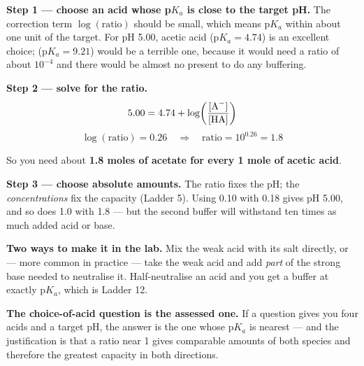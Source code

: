 \documentclass{apchem-worksheet}
\begin{document}
\begin{workedexample}
\textbf{Step 1 --- choose an acid whose p$K_{a}$ is close to the target
pH.} The correction term $\log(\text{ratio})$ should be small, which
means p$K_{a}$ within about one unit of the target. For pH 5.00, acetic
acid (p$K_{a} = 4.74$) is an excellent choice; 
(p$K_{a} = 9.21$) would be a terrible one, because it would need a
ratio of about $10^{-4}$ and there would be almost no  present
to do any buffering.

\textbf{Step 2 --- solve for the ratio.}
\[ 5.00 = 4.74 + \log\!\left(\frac{[\ce{A-}]}{[\ce{HA}]}\right) \]
\[ \log(\text{ratio}) = 0.26
   \quad\Longrightarrow\quad
   \text{ratio} = 10^{0.26} = \mathbf{1.8} \]

So you need about \textbf{1.8 moles of acetate for every 1 mole of
acetic acid}.

\textbf{Step 3 --- choose absolute amounts.} The ratio fixes the pH;
the \emph{concentrations} fix the capacity (Ladder 5). Using
\SI{0.10}{\Molar}  with \SI{0.18}{\Molar}  gives pH 5.00,
and so does \SI{1.0}{\Molar} with \SI{1.8}{\Molar} --- but the second
buffer will withstand ten times as much added acid or base.

\textbf{Two ways to make it in the lab.} Mix the weak acid with its
salt directly, or --- more common in practice --- take the weak acid and
add \emph{part} of the strong base needed to neutralise it. Half-neutralise
an acid and you get a buffer at exactly p$K_{a}$, which is Ladder 12.

\textbf{The choice-of-acid question is the assessed one.} If a question
gives you four acids and a target pH, the answer is the one whose
p$K_{a}$ is nearest --- and the justification is that a ratio near 1
gives comparable amounts of both species and therefore the greatest
capacity in both directions.
\end{workedexample}
\end{document}
